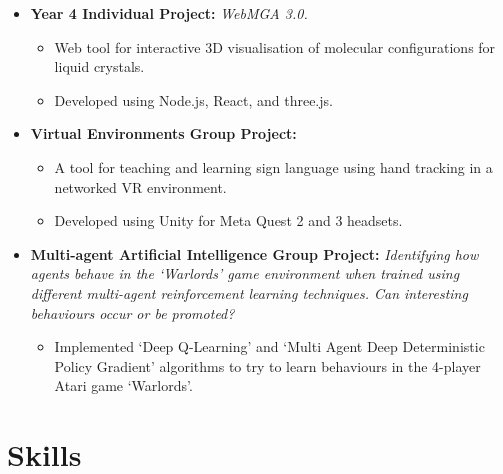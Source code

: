 \documentclass{moderncv}
\begin{document}
{\begin{itemize}
\begin{itemize}
                \textit{Parameter-Wise Double Descent - A Unified Model or Not?}
                \begin{itemize}
                    \item Investigated and questioned the ubiquity of the double descent phenomenon by training a range of neural networks on the MNIST dataset.
                \end{itemize}
                \item\textbf{Year 4 Individual Project:}
                \textit{WebMGA 3.0.}
                \begin{itemize}
                    \item Web tool for interactive 3D visualisation of molecular configurations for liquid crystals.
                    \item Developed using Node.js, React, and three.js.
                \end{itemize}
                \item\textbf{Virtual Environments Group Project:}
                \begin{itemize}
                    \item A tool for teaching and learning sign language using hand tracking in a networked VR environment.
                    \item Developed using Unity for Meta Quest 2 and 3 headsets.
                \end{itemize}
                \item\textbf{Multi-agent Artificial Intelligence Group Project:}
                \textit{Identifying how agents behave in the `Warlords' game environment when trained using different multi-agent reinforcement learning techniques. Can interesting behaviours occur or be promoted?}
                \begin{itemize}
                    \item Implemented `Deep Q-Learning' and `Multi Agent Deep Deterministic Policy Gradient' algorithms to try to learn behaviours in the 4-player Atari game `Warlords'.
                \end{itemize}
            \end{itemize}
        \end{itemize}
        }


    \section{Skills}
\end{document}
